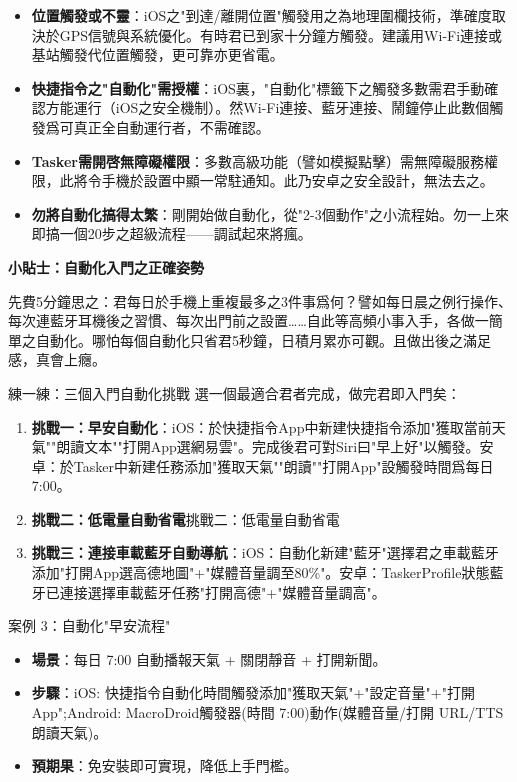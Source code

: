 \begin{itemize}
  \item \textbf{位置觸發或不靈}：iOS之"到達/離開位置"觸發用之為地理圍欄技術，準確度取決於GPS信號與系統優化。有時君已到家十分鐘方觸發。建議用Wi-Fi連接或基站觸發代位置觸發，更可靠亦更省電。
  \item \textbf{快捷指令之"自動化"需授權}：iOS裏，"自動化"標籤下之觸發多數需君手動確認方能運行（iOS之安全機制）。然Wi-Fi連接、藍牙連接、鬧鐘停止此數個觸發爲可真正全自動運行者，不需確認。
  \item \textbf{Tasker需開啓無障礙權限}：多數高級功能（譬如模擬點擊）需無障礙服務權限，此將令手機於設置中顯一常駐通知。此乃安卓之安全設計，無法去之。
  \item \textbf{勿將自動化搞得太繁}：剛開始做自動化，從"2-3個動作"之小流程始。勿一上來即搞一個20步之超級流程——調試起來將瘋。
\end{itemize}

\textbf{小貼士：自動化入門之正確姿勢}\par

先費5分鐘思之：君每日於手機上重複最多之3件事爲何？譬如每日晨之例行操作、每次連藍牙耳機後之習慣、每次出門前之設置……自此等高頻小事入手，各做一簡單之自動化。哪怕每個自動化只省君5秒鐘，日積月累亦可觀。且做出後之滿足感，真會上癮。

\begin{tcbpractice}{練一練：三個入門自動化挑戰}
選一個最適合君者完成，做完君即入門矣：

\begin{enumerate}
  \item \textbf{挑戰一：早安自動化}：iOS：於快捷指令App中新建快捷指令添加"獲取當前天氣""朗讀文本""打開App選網易雲"。完成後君可對Siri曰"早上好"以觸發。安卓：於Tasker中新建任務添加"獲取天氣""朗讀""打開App"設觸發時間爲每日7:00。
  \item \textbf{挑戰二：低電量自動省電}挑戰二：低電量自動省電
  \item \textbf{挑戰三：連接車載藍牙自動導航}：iOS：自動化新建"藍牙"選擇君之車載藍牙添加"打開App選高德地圖"+"媒體音量調至80\%"。安卓：TaskerProfile狀態藍牙已連接選擇車載藍牙任務"打開高德"+"媒體音量調高"。
\end{enumerate}

\end{tcbpractice}

\begin{tcbinfo}{案例 3：自動化"早安流程"}
\begin{itemize}
  \item \textbf{場景}：每日 7:00 自動播報天氣 + 關閉靜音 + 打開新聞。
  \item \textbf{步驟}：iOS: 快捷指令自動化時間觸發添加"獲取天氣"+"設定音量"+"打開 App";Android: MacroDroid觸發器(時間 7:00)動作(媒體音量/打開 URL/TTS 朗讀天氣)。
  \item \textbf{預期果}：免安裝即可實現，降低上手門檻。
\end{itemize}

\end{tcbinfo}
